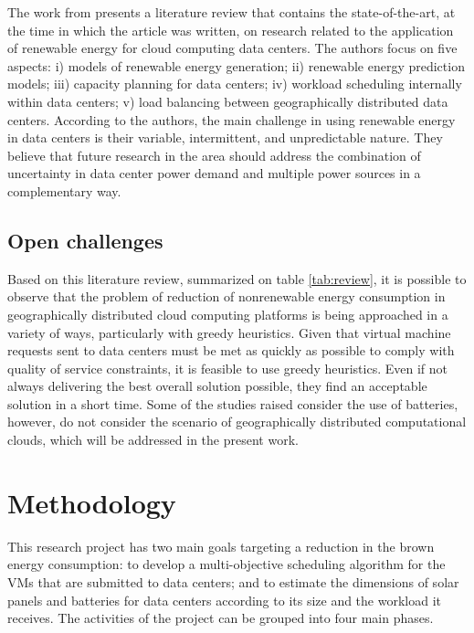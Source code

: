 \documentclass[12pt,a4paper]{article}
\begin{document}
The work from \citet{taxonomy} presents a literature review that contains the state-of-the-art, at the time in which the article was written, on research related to the application of renewable energy for cloud computing data centers. The authors focus on five aspects: i) models of renewable energy generation; ii) renewable energy prediction models; iii) capacity planning for data centers; iv) workload scheduling internally within data centers; v) load balancing between geographically distributed data centers. According to the authors, the main challenge in using renewable energy in data centers is their variable, intermittent, and unpredictable nature. They believe that future research in the area should address the combination of uncertainty in data center power demand and multiple power sources in a complementary way.


\subsection{Open challenges}
Based on this literature review, summarized on table \ref{tab:review}, it is possible to observe that the problem of reduction of nonrenewable energy consumption in geographically distributed cloud computing platforms is being approached in a variety of ways, particularly with greedy heuristics. Given that virtual machine requests sent to data centers must be met as quickly as possible to comply with quality of service constraints, it is feasible to use greedy heuristics. Even if not always delivering the best overall solution possible, they find an acceptable solution in a short time. Some of the studies raised consider the use of batteries, however, do not consider the scenario of geographically distributed computational clouds, which will be addressed in the present work.


\section{Methodology}

This research project has two main goals targeting a reduction in the brown energy consumption: to develop a multi-objective scheduling algorithm for the VMs that are submitted to data centers; and to estimate the dimensions of solar panels and batteries for data centers according to its size and the workload it receives. The activities of the project can be grouped into four main phases.
\end{document}
